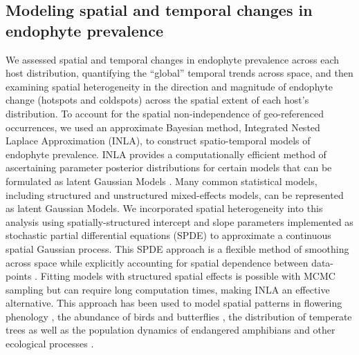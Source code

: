 \documentclass[11pt]{article}
\let\cite\citep
\newcommand{\tom}[2]{{\color{red}{#1}}\footnote{\textit{\color{red}{#2}}}}
\newcommand{\firstrevise}[1]{{\color{black}{#1}}}
\begin{document}
\subsection*{Modeling spatial and temporal changes in endophyte prevalence}
We assessed spatial and temporal changes in endophyte prevalence across each host distribution, quantifying the ``global'' temporal trends \linelabel{R2C27-begin}\firstrevise{averaged} across space, and then examining spatial heterogeneity in the direction and magnitude of endophyte change (hotspots and coldspots) across the spatial extent of each host's distribution.
To account for the spatial non-independence of geo-referenced occurrences, we used an approximate Bayesian method, Integrated Nested Laplace Approximation (INLA), to construct spatio-temporal models of endophyte prevalence.
INLA provides a computationally efficient method of ascertaining parameter posterior distributions for certain models that can be formulated as latent Gaussian Models \cite{rue2009approximate}.
Many common statistical models, including structured and unstructured mixed-effects models, can be represented as latent Gaussian Models.
We incorporated spatial heterogeneity into this analysis using spatially-structured intercept and slope parameters implemented as stochastic partial differential equations (SPDE) to approximate a continuous spatial Gaussian process. 
This SPDE approach is a flexible method of smoothing across space while explicitly accounting for spatial dependence between data-points \citep{lindgren2011explicit,bakka2018spatial}.
Fitting models with structured spatial effects is possible with MCMC sampling but can require long computation times, making INLA an effective alternative. 
This approach has been used to model spatial patterns in flowering phenology \cite{willems2022forest}, the abundance of birds \cite{meehan2019spatial} and butterflies \cite{crossley2022opposing}, the distribution of temperate trees \cite{engel2022spatial} as well as the population dynamics of endangered amphibians \cite{knapp2016large} and other ecological processes \cite{beguin2012hierarchical}.
\end{document}
